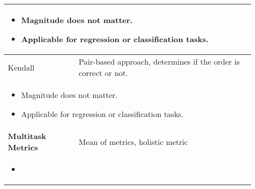 \begin{summary}
\begin{center}
\begin{tabular}{ll}
        \multicolumn{2}{p{\linewidth}}{
        \begin{itemize}
            \item Magnitude does not matter.
            \item Applicable for regression or classification tasks.
        \end{itemize}} \\
        \midrule
        Kendall & Pair-based approach, determines if the order is correct or not. \\
        \multicolumn{2}{p{\linewidth}}{
        \begin{itemize}
            \item Magnitude does not matter.
            \item Applicable for regression or classification tasks.
        \end{itemize}} \\
        \midrule
        \textbf{Multitask Metrics} & Mean of metrics, holistic metric \\
        \multicolumn{2}{p{\linewidth}}{
        \begin{itemize}
            \item 
        \end{itemize}} \\
        \bottomrule
        \end{tabular}
    \end{center}
\end{summary}
\newpage

